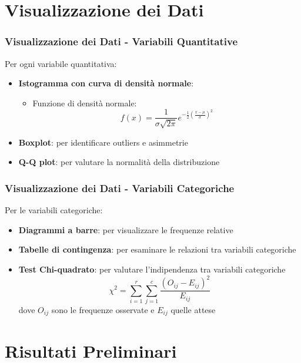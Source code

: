 \documentclass{beamer}
\begin{document}
\section{Visualizzazione dei Dati}

\begin{frame}
\frametitle{Visualizzazione dei Dati - Variabili Quantitative}
Per ogni variabile quantitativa:
\begin{itemize}
    \item \textbf{Istogramma con curva di densità normale}:
    \begin{itemize}
        \item Funzione di densità normale: 
        \[f(x) = \frac{1}{\sigma\sqrt{2\pi}} e^{-\frac{1}{2}(\frac{x-\mu}{\sigma})^2}\]
    \end{itemize}
    \item \textbf{Boxplot}: per identificare outliers e asimmetrie
    \item \textbf{Q-Q plot}: per valutare la normalità della distribuzione
\end{itemize}
\end{frame}

\begin{frame}
\frametitle{Visualizzazione dei Dati - Variabili Categoriche}
Per le variabili categoriche:
\begin{itemize}
    \item \textbf{Diagrammi a barre}: per visualizzare le frequenze relative
    \item \textbf{Tabelle di contingenza}: per esaminare le relazioni tra variabili categoriche
    \item \textbf{Test Chi-quadrato}: per valutare l'indipendenza tra variabili categoriche
    \[\chi^2 = \sum_{i=1}^r \sum_{j=1}^c \frac{(O_{ij} - E_{ij})^2}{E_{ij}}\]
    dove $O_{ij}$ sono le frequenze osservate e $E_{ij}$ quelle attese
\end{itemize}
\end{frame}

\section{Risultati Preliminari}
\end{document}
